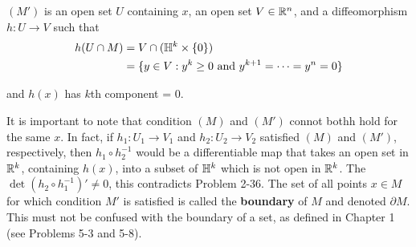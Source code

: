 \noindent $(M')$ is an open set $U$ containing $x$, an open set $V\in\mathbb{R}^n$, and a diffeomorphism 
$h:U\to V$ such that 
\begin{align*}
    h(U\cap M) 
    & = V\cap(\mathbb{H}^k\times \{0\}) \\
    & = \{y\in V:y^k\ge 0\text{ and } y^{k+1}=\cdots=y^n=0\}
\end{align*}

and $h(x)$ has $k$th component = 0.

It is important to note that condition $(M)$ and $(M')$ connot bothh hold for the same $x$. In 
fact, if $h_1:U_1\to V_1$ and $h_2:U_2\to V_2$ satisfied $(M)$ and $(M')$, respectively, then 
$h_1\circ h_2^{-1}$ would be a differentiable map that takes an open set in $\mathbb{R}^k$, containing
$h(x)$, into a subset of $\mathbb{H}^k$ which is not open in $\mathbb{R}^k$. The $\det (h_2\circ h_1^{-1})'\neq 0$,
this contradicts Problem 2-36. The set of all points $x\in M$ for which condition $M'$ is satisfied
is called the \textbf{boundary} of $M$ and denoted $\partial M$. This must not be confused with the 
boundary of a set, as defined in Chapter 1 (see Problems 5-3 and 5-8).


